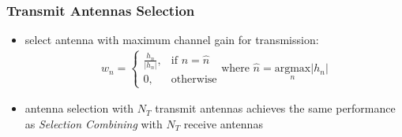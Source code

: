 \documentclass[a4paper, 10pt]{article}
\begin{document}
\subsubsection*{Transmit Antennas Selection}
\begin{itemize}
	\item select antenna with maximum channel gain for transmission:
		\begin{align*} 
			w_n = 
			\begin{cases}
\frac{h_n}{|h_n|},  & \text{if } n = \hat{n}\\
0, & \text{otherwise}
\end{cases} \text{where } \hat{n} = \underset{n}{\mathrm{argmax}}|h_n|
		\end{align*}
	\item antenna selection with $ N_T$ transmit antennas achieves the same performance as \textit{Selection Combining} with $ N_T$ receive antennas
\end{itemize}
\end{document}
